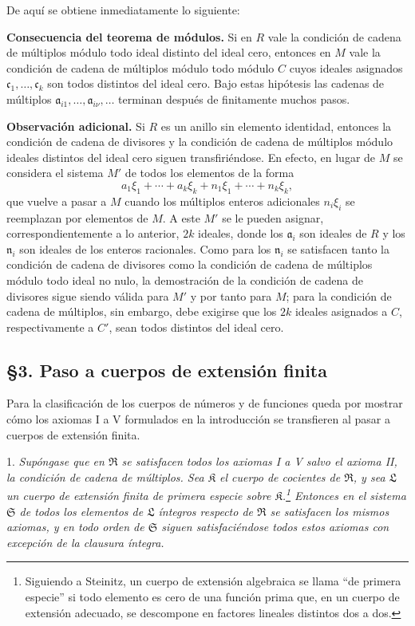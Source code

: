 \documentclass[11pt]{article}
\providecommand{\mR}{\mathfrak{R}}
\providecommand{\mK}{\mathfrak{K}}
\providecommand{\mL}{\mathfrak{L}}
\providecommand{\mS}{\mathfrak{S}}
\begin{document}
De aquí se obtiene inmediatamente lo siguiente:

\medskip
\noindent\textbf{Consecuencia del teorema de módulos.} Si en $R$ vale la condición de cadena de múltiplos módulo todo ideal distinto del ideal cero, entonces en $M$ vale la condición de cadena de múltiplos módulo todo módulo $C$ cuyos ideales asignados $\mathfrak c_1,\ldots,\mathfrak c_k$ son todos distintos del ideal cero. Bajo estas hipótesis las cadenas de múltiplos $\mathfrak a_{i1},\ldots,\mathfrak a_{i\nu},\ldots$ terminan después de finitamente muchos pasos.

\medskip
\noindent\textbf{Observación adicional.} Si $R$ es un anillo sin elemento identidad, entonces la condición de cadena de divisores y la condición de cadena de múltiplos módulo ideales distintos del ideal cero siguen transfiriéndose. En efecto, en lugar de $M$ se considera el sistema $M'$ de todos los elementos de la forma
\[
        a_1\xi_1+\cdots+a_k\xi_k+n_1\xi_1+\cdots+n_k\xi_k,
\]
que vuelve a pasar a $M$ cuando los múltiplos enteros adicionales $n_i\xi_i$ se reemplazan por elementos de $M$. A este $M'$ se le pueden asignar, correspondientemente a lo anterior, $2k$ ideales, donde los $\mathfrak a_i$ son ideales de $R$ y los $\mathfrak n_i$ son ideales de los enteros racionales. Como para los $\mathfrak n_i$ se satisfacen tanto la condición de cadena de divisores como la condición de cadena de múltiplos módulo todo ideal no nulo, la demostración de la condición de cadena de divisores sigue siendo válida para $M'$ y por tanto para $M$; para la condición de cadena de múltiplos, sin embargo, debe exigirse que los $2k$ ideales asignados a $C$, respectivamente a $C'$, sean todos distintos del ideal cero.

\subsection*{§3. Paso a cuerpos de extensión finita}

Para la clasificación de los cuerpos de números y de funciones queda por mostrar cómo los axiomas I a V formulados en la introducción se transfieren al pasar a cuerpos de extensión finita.

1. \emph{Supóngase que en $\mR$ se satisfacen todos los axiomas I a V salvo el axioma II, la condición de cadena de múltiplos. Sea $\mK$ el cuerpo de cocientes de $\mR$, y sea $\mL$ un cuerpo de extensión finita de primera especie sobre $\mK$.\footnote{Siguiendo a Steinitz, un cuerpo de extensión algebraica se llama ``de primera especie'' si todo elemento es cero de una función prima que, en un cuerpo de extensión adecuado, se descompone en factores lineales distintos dos a dos.} Entonces en el sistema $\mS$ de todos los elementos de $\mL$ íntegros respecto de $\mR$ se satisfacen los mismos axiomas, y en todo orden de $\mS$ siguen satisfaciéndose todos estos axiomas con excepción de la clausura íntegra.}
\end{document}
